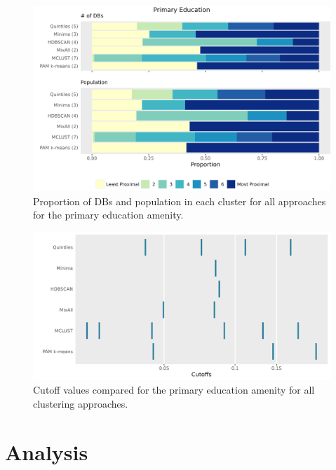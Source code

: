 \documentclass[11pt, a4paper]{article}
\begin{document}
\begin{figure}[H]
\centering
\includegraphics[width=\textwidth]{./barplot_comparison/Primary Education_barplot.png}
\caption[Primary education profile barplot]{Proportion of DBs and population in each cluster for all approaches for the primary education amenity.}\label{prieducbarplot}
\end{figure}



\begin{figure}[H]
\centering
\includegraphics[width=\textwidth]{./cutoff_ticks/Primary Education_ticks.png}
\caption[Primary Education cutoff comparison]{Cutoff values compared for the primary education amenity for all clustering approaches.}\label{prieducticks}
\end{figure}











\pagebreak
\section{Analysis}
\end{document}
